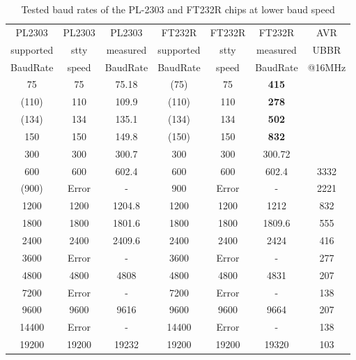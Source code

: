 \begin{table}[H]
  \begin{center}
    \begin{tabular}{| c | c | c || c | c | c || c |}
    \hline
    PL2303     & PL2303 & PL2303   &  FT232R   & FT232R & FT232R    & AVR \\
    supported  & stty  & measured  & supported & stty   & measured  & UBBR  \\
    BaudRate   & speed & BaudRate  & BaudRate  & speed  & BaudRate  & @16MHz \\
    \hline
    \hline
         75    &  75   &  75.18    &  (75)     &   75   &  \bf{415}  &        \\
    \hline
      (110)    &  110  &  109.9    &  (110)    & 110    & \bf{278} &        \\
    \hline
      (134)    &  134  &  135.1    &  (134)    & 134    & \bf{502}   &       \\
    \hline
        150    & 150   &  149.8    &  (150)    & 150    & \bf{832} &        \\
    \hline
        300    & 300   &  300.7    &   300     & 300    & 300.72     &       \\
    \hline
        600    & 600   &  602.4    &   600     & 600    & 602.4     &  3332  \\
    \hline
      (900)    & Error &    -      &   900     & Error  &    -      &  2221 \\
    \hline
       1200    & 1200  &  1204.8   &   1200    & 1200   & 1212    &   832  \\
    \hline
       1800    & 1800  &  1801.6   &   1800    & 1800   & 1809.6    &   555 \\
    \hline
       2400    & 2400  &  2409.6   &   2400    & 2400   & 2424    &   416  \\
    \hline
       3600    & Error &   -       &   3600    & Error  &    -      &   277  \\
    \hline
       4800    & 4800  &  4808     &   4800    & 4800   & 4831      &   207  \\
    \hline
       7200    & Error &   -       &   7200    &  Error &    -      &   138  \\
    \hline
       9600    & 9600  &  9616     &   9600    &  9600  &  9664     &   207  \\
    \hline
      14400    & Error &   -       &  14400    & Error  &    -      &   138  \\
    \hline
      19200    & 19200  & 19232    &  19200    & 19200  & 19320     &   103  \\
    \hline
    \end{tabular}
  \end{center}
  \caption{Tested baud rates of the PL-2303 and FT232R chips at lower baud speed}
  \label{tab:PL2302baudl}
\end{table}

